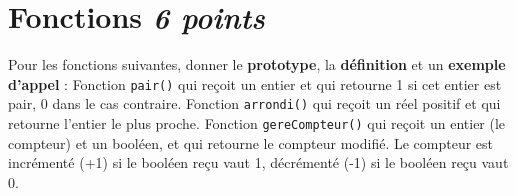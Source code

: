 
\section{Fonctions \hfill \textit{6 points}}

Pour les fonctions suivantes, donner le \textbf{prototype}, la \textbf{définition} et un \textbf{exemple d'appel} :
    \UPSTIquestion Fonction \texttt{pair()} qui reçoit un entier et qui retourne 1 si cet entier est pair, 0 dans le cas contraire.
\espaceReponse{5cm}
    \UPSTIquestion Fonction \texttt{arrondi()} qui reçoit un réel positif et qui retourne l'entier le plus proche.
\espaceReponse{5cm}
    \UPSTIquestion Fonction \texttt{gereCompteur()} qui reçoit un entier (le compteur) et un booléen, et qui retourne le compteur modifié. Le compteur est incrémenté (+1) si le booléen reçu vaut 1, décrémenté (-1) si le booléen reçu vaut 0.

\espaceReponse{5cm}
